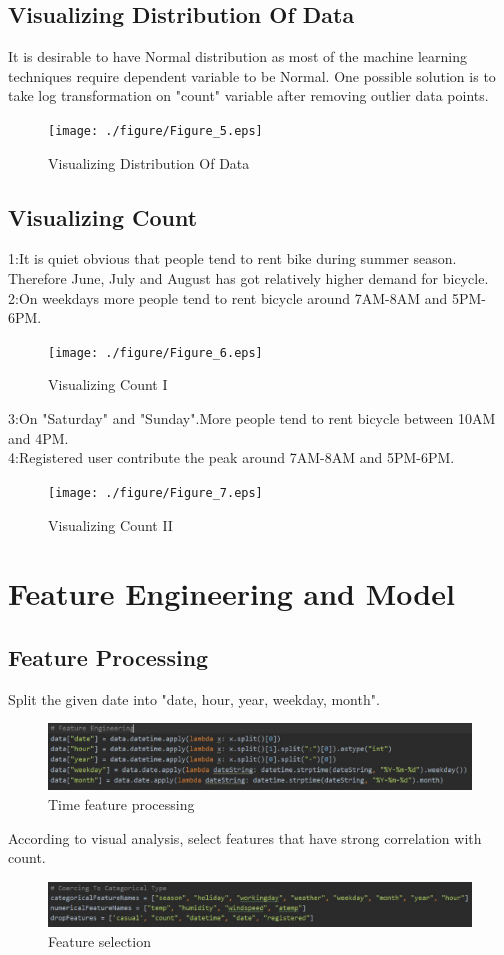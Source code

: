 \subsection{Visualizing Distribution Of Data}
 It is desirable to have Normal distribution as most of the machine learning techniques require dependent variable to be Normal. One possible solution is to take log transformation on "count" variable after removing outlier data points.
\begin{figure}[htbp]
	\texttt{[image: ./figure/Figure\_5.eps]}
	\caption{Visualizing Distribution Of Data}
\end{figure}

\subsection{Visualizing Count}
	1:It is quiet obvious that people tend to rent bike during summer season. Therefore June, July and August has got relatively higher demand for bicycle.\\
2:On weekdays more people tend to rent bicycle around 7AM-8AM and 5PM-6PM. 
\begin{figure}[htbp]
	\texttt{[image: ./figure/Figure\_6.eps]}
	\caption{Visualizing Count I}
\end{figure}

3:On "Saturday" and "Sunday".More people tend to rent bicycle between 10AM and 4PM.\\
4:Registered user contribute the peak around 7AM-8AM and 5PM-6PM.
\begin{figure}[htbp]
	\texttt{[image: ./figure/Figure\_7.eps]}
	\caption{Visualizing Count II}
\end{figure}


\section{Feature Engineering and Model} \label{sec-method}
\subsection{Feature Processing}
Split the given date into "date, hour, year, weekday, month".
\begin{figure}[htbp]
	\includegraphics[scale=0.5]{./figure/1.eps}
	\caption{Time feature processing}
\end{figure}
According to visual analysis, select features that have strong correlation with count.
\begin{figure}[htbp]
	\includegraphics[scale=0.5]{./figure/2.eps}
	\caption{Feature selection}
\end{figure}

